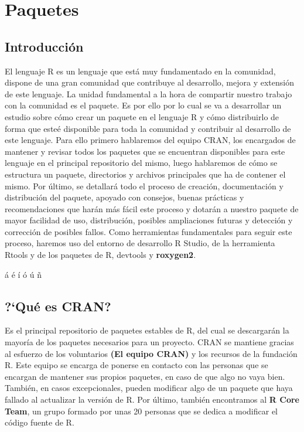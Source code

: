 \section{Paquetes}
\subsection{Introducci\'on}


El lenguaje R es un lenguaje que est\'a muy fundamentado en la comunidad, dispone de una gran comunidad que 
contribuye al desarrollo, mejora y extensi\'on de este lenguaje. La unidad fundamental a la hora de compartir 
nuestro trabajo con la comunidad es el paquete. Es por ello por lo cual se va a desarrollar un estudio sobre 
c\'omo crear un paquete en el lenguaje R y c\'omo distribuirlo de forma que este\'e disponible para toda la 
comunidad y contribuir al desarrollo de este lenguaje.
Para ello primero hablaremos del equipo CRAN, los encargados de mantener y revisar todos los paquetes que
se encuentran disponibles para este lenguaje en el principal repositorio del mismo, luego hablaremos de 
c\'omo se estructura un paquete, directorios y archivos principales que ha de contener el mismo. Por \'ultimo, 
se detallar\'a todo el proceso de creaci\'on, documentaci\'on y distribuci\'on del paquete, apoyado con 
consejos, buenas pr\'acticas y recomendaciones que har\'an m\'as f\'acil este proceso y dotar\'an a nuestro 
paquete de mayor facilidad de uso, distribuci\'on, posibles ampliaciones futuras y detecci\'on y correcci\'on 
de posibles fallos.
Como herramientas fundamentales para seguir este proceso, haremos uso del entorno de desarrollo R Studio, 
de la herramienta Rtools y de los paquetes de R, devtools y \textbf{roxygen2}.

\'a
\'e
\'i
\'o
\'u
\~n

\subsection{?`Qu\'e es CRAN?}

Es el principal repositorio de paquetes estables de R, del cual se descargar\'an la mayor\'ia de los paquetes 
necesarios para un proyecto.
CRAN se mantiene gracias al esfuerzo de los voluntarios \textbf{(El equipo CRAN)} y los recursos de la fundaci\'on R. 
Este equipo se encarga de ponerse en contacto con las personas que se encargan de mantener sus propios paquetes, 
en caso de que algo no vaya bien.
Tambi\'en, en casos excepcionales, pueden modificar algo de un paquete que haya fallado al actualizar la versi\'on 
de R.
Por \'ultimo, tambi\'en encontramos al \textbf{R Core Team}, un grupo formado por unas 20 personas que se dedica a modificar 
el c\'odigo fuente de R.

